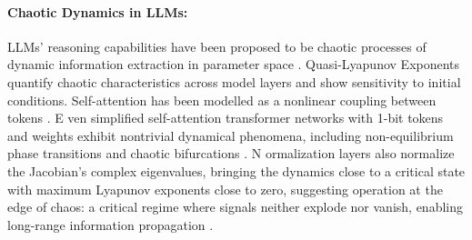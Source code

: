 \documentclass[a4paper,12pt]{article}
\begin{document}
    \paragraph{Chaotic Dynamics in LLMs:}

    LLMs' reasoning capabilities have been proposed to be chaotic processes of dynamic information extraction in parameter space \cite{li2025cognitive_activation}. Quasi-Lyapunov Exponents quantify chaotic characteristics across model layers and show sensitivity to initial conditions.
    Self-attention has been modelled as a nonlinear coupling between tokens \cite{geshkovski2025mathematicalperspectivetransformers}.
    E ven simplified self-attention transformer networks with 1-bit tokens and weights exhibit nontrivial dynamical phenomena, including non-equilibrium phase transitions and chaotic bifurcations \cite{dynamicalmeanfieldtheoryselfattention}. 
    N ormalization layers also normalize the Jacobian's complex eigenvalues, bringing the dynamics close to a critical state with maximum Lyapunov exponents close to zero, suggesting operation at the edge of chaos: a critical regime where signals neither explode nor vanish, enabling long-range information propagation \cite{tomihari2025recurrent_self_attention_dynamics}.
\end{document}
